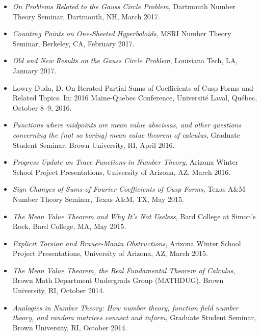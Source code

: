 \begin{itemize}

    \item \emph{On Problems Related to the Gauss Circle Problem},
      Dartmouth Number Theory Seminar,
      Dartmouth, NH,
      March 2017.

    \item \emph{Counting Points on One-Sheeted Hyperboloids},
      MSRI Number Theory Seminar,
      Berkeley, CA,
      February 2017.

    \item \emph{Old and New Results on the Gauss Circle Problem},
      Louisiana Tech, LA,
      January 2017.

    \item Lowry-Duda, D.
      On Iterated Partial Sums of Coefficients of Cusp Forms and Related Topics.
      In: 2016 Maine-Quebec Conference,
      Universit\'{e} Laval, Qu\'{e}bec,
      October 8--9, 2016.

    \item \emph{Functions where midpoints are mean value abscissas, and other questions
      concerning the (not so boring) mean value theorem of calculus},
      Graduate Student Seminar,
      Brown University, RI,
      April 2016.

    \item \emph{Progress Update on Trace Functions in Number Theory},
      Arizona Winter School Project Presentations,
      University of Arizona, AZ,
      March 2016.

    \item \emph{Sign Changes of Sums of Fourier Coefficients of Cusp Forms},
      Texas A\&M Number Theory Seminar,
      Texas A\&M, TX,
      May 2015.

    \item \emph{The Mean Value Theorem and Why It's Not Useless},
      Bard College at Simon's Rock,
      Bard College, MA,
      May 2015.

    \item \emph{Explicit Torsion and Brauer-Manin Obstructions},
      Arizona Winter School Project Presentations,
      University of Arizona, AZ,
      March 2015.

    \item \emph{The Mean Value Theorem, the Real Fundamental Theorem of Calculus},
      Brown Math Department Undergrads Group (MATHDUG),
      Brown University, RI,
      October 2014.

    \item \emph{Analogies in Number Theory: How number theory, function field number
      theory, and random matrices connect and inform},
      Graduate Student Seminar,
      Brown University, RI,
      October 2014.


\end{itemize}
